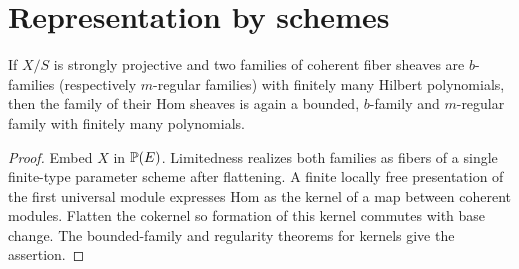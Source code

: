 \section{Representation by schemes}

\begin{lemma}
\label{akcp-6-1-hom-family}
If $X/S$ is strongly projective and two families of coherent fiber sheaves are
$b$-families (respectively $m$-regular families) with finitely many Hilbert
polynomials, then the family of their Hom sheaves is again a bounded,
$b$-family and $m$-regular family with finitely many polynomials.
\end{lemma}
\begin{proof}
Embed $X$ in $\mathbb P(E)$.  Limitedness realizes both families as fibers of a
single finite-type parameter scheme after flattening.  A finite locally free
presentation of the first universal module expresses Hom as the kernel of a
map between coherent modules.  Flatten the cokernel so formation of this kernel
commutes with base change.  The bounded-family and regularity theorems for
kernels give the assertion.
\end{proof}

